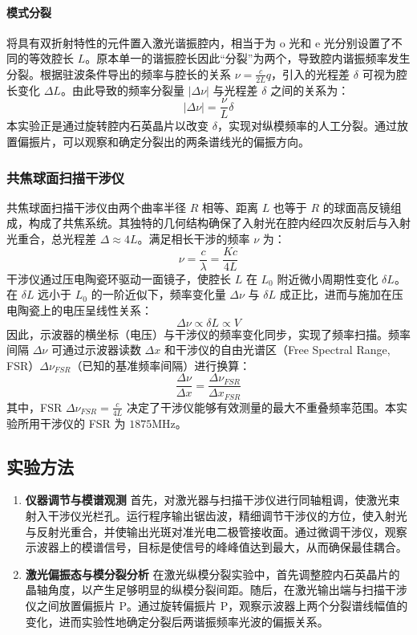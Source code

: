 \documentclass[a4paper, 1.5lines]{ctexart}
\begin{document}
\paragraph{模式分裂}
将具有双折射特性的元件置入激光谐振腔内，相当于为 o 光和 e 光分别设置了不同的等效腔长 $L$。原本单一的谐振腔长因此“分裂”为两个，导致腔内谐振频率发生分裂。根据驻波条件导出的频率与腔长的关系 $\nu = \frac{c}{2L} q$，引入的光程差 $\delta$ 可视为腔长变化 $\Delta L$。由此导致的频率分裂量 $|\Delta \nu|$ 与光程差 $\delta$ 之间的关系为：
$$
|\Delta \nu| = \frac{\nu}{L} \delta
$$
本实验正是通过旋转腔内石英晶片以改变 $\delta$，实现对纵模频率的人工分裂。通过放置偏振片，可以观察和确定分裂出的两条谱线光的偏振方向。

\subsubsection{共焦球面扫描干涉仪}

共焦球面扫描干涉仪由两个曲率半径 $R$ 相等、距离 $L$ 也等于 $R$ 的球面高反镜组成，构成了共焦系统。其独特的几何结构确保了入射光在腔内经四次反射后与入射光重合，总光程差 $\Delta \approx 4L$。满足相长干涉的频率 $\nu$ 为：
$$
\nu = \frac{c}{\lambda} = \frac{K c}{4 L}
$$
干涉仪通过压电陶瓷环驱动一面镜子，使腔长 $L$ 在 $L_0$ 附近微小周期性变化 $\delta L$。在 $\delta L$ 远小于 $L_0$ 的一阶近似下，频率变化量 $\Delta \nu$ 与 $\delta L$ 成正比，进而与施加在压电陶瓷上的电压呈线性关系：
$$
\Delta \nu \propto \delta L \propto V
$$
因此，示波器的横坐标（电压）与干涉仪的频率变化同步，实现了频率扫描。频率间隔 $\Delta \nu$ 可通过示波器读数 $\Delta x$ 和干涉仪的自由光谱区（Free Spectral Range, FSR）$\Delta \nu_{FSR}$（已知的基准频率间隔）进行换算：
$$
\dfrac{\Delta \nu}{\Delta x} = \dfrac{\Delta \nu_{FSR}}{\Delta x_{FSR}}
$$
其中，FSR $\Delta \nu_{FSR} = \frac{c}{4 L}$ 决定了干涉仪能够有效测量的最大不重叠频率范围。本实验所用干涉仪的 FSR 为 $1875 \mathrm{MHz}$。

\subsection{实验方法}
\begin{enumerate}
    \item \textbf{仪器调节与模谱观测}
    首先，对激光器与扫描干涉仪进行同轴粗调，使激光束射入干涉仪光栏孔。运行程序输出锯齿波，精细调节干涉仪的方位，使入射光与反射光重合，并使输出光斑对准光电二极管接收面。通过微调干涉仪，观察示波器上的模谱信号，目标是使信号的峰峰值达到最大，从而确保最佳耦合。
    
    \item \textbf{激光偏振态与模分裂分析}
    在激光纵模分裂实验中，首先调整腔内石英晶片的晶轴角度，以产生足够明显的纵模分裂间距。随后，在激光输出端与扫描干涉仪之间放置偏振片 P。通过旋转偏振片 P，观察示波器上两个分裂谱线幅值的变化，进而实验性地确定分裂后两谐振频率光波的偏振关系。
\end{enumerate}
            
\end{document}
